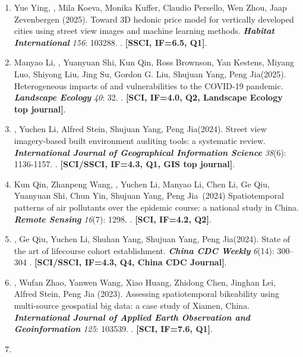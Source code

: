 \begin{enumerate}
\item    
    Yue Ying, \Shaoqing\CS, Mila Koeva, Monika Kuffer, Claudio Persello, Wen Zhou, Jaap Zevenbergen (2025).
    Toward 3D hedonic price model for vertically developed cities using street view images and machine learning methods. 
    \textbf{\textit{Habitat International}} \textit{156}: 103288.
    . \textbf{[SSCI, IF=6.5, Q1]}.
\item    
    Manyao Li\CF, \Shaoqing\CF, Yuanyuan Shi\CF, Kun Qin\CF, Ross Brownson, Yan Kestens, Miyang Luo, Shiyong Liu, Jing Su, Gordon G. Liu, Shujuan Yang\CS, Peng Jia\CS (2025).
    Heterogeneous impacts of and vulnerabilities to the COVID-19 pandemic. 
    \textbf{\textit{Landscape Ecology}} \textit{40}: 32.
    . \textbf{[SCI, IF=4.0, Q2, Landscape Ecology top journal]}.
\item
    \Shaoqing, Yuchen Li, Alfred Stein, Shujuan Yang, Peng Jia\CS (2024).
    Street view imagery-based built environment auditing tools: a systematic review. 
    \textbf{\textit{International Journal of Geographical Information Science}} \textit{38}(6): 1136-1157.
    . \textbf{[SCI/SSCI, IF=4.3, Q1, GIS top journal]}.
\item
    Kun Qin\CF, Zhanpeng Wang\CF, \Shaoqing\CF, Yuchen Li, Manyao Li, Chen Li, Ge Qiu, Yuanyuan Shi, Chun Yin, Shujuan Yang, Peng Jia\CS \ (2024)
    Spatiotemporal patterns of air pollutants over the epidemic course: a national study in China. 
    \textbf{\textit{Remote Sensing}} \textit{16}(7): 1298.
    . \textbf{[SCI, IF=4.2, Q2]}.
\item
    \Shaoqing, Ge Qiu, Yuchen Li, Shuhan Yang, Shujuan Yang, Peng Jia\CS (2024).
    State of the art of lifecourse cohort establishment. 
    \textbf{\textit{China CDC Weekly}} \textit{6}(14): 300–304 
    . \textbf{[SCI/SSCI, IF=4.3, Q4, China CDC Journal]}.
\item
    \Shaoqing, Wufan Zhao\CS, Yanwen Wang, Xiao Huang, Zhidong Chen, Jinghan Lei, Alfred Stein, Peng Jia (2023).
    Assessing spatiotemporal bikeability using multi-source geospatial big data: a case study of Xiamen, China. 
    \textbf{\textit{International Journal of Applied Earth Observation and Geoinformation}} \textit{125}: 103539.
    . \textbf{[SCI, IF=7.6, Q1]}.
\item

\end{enumerate}
